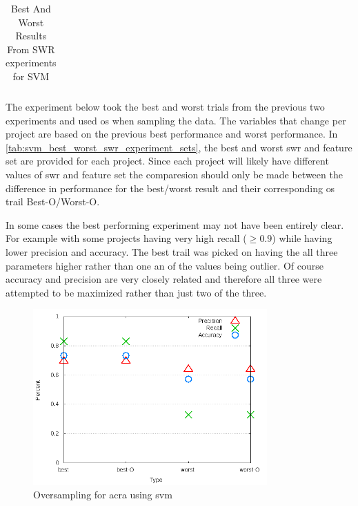\begin{table}[ht]
\begin{center}
\begin{tabular}{|c|c|c|c|c|}

        \hline
    \end{tabular}
    \caption{Best And Worst Results From SWR experiments for SVM}
    \label{tab:svm_best_worst_swr_experiment_sets}
\end{center}
\end{table}

The experiment below took the best and worst trials from the previous two experiments and used \gls{os} when sampling the data. The variables that change per project are based on the previous best performance and worst performance. In \autoref{tab:svm_best_worst_swr_experiment_sets}, the best and worst \gls{swr} and feature set are provided for each project. Since each project will likely have different values of \gls{swr} and feature set the comparesion should only be made between the difference in performance for the best/worst result and their corresponding \gls{os} trail Best-O/Worst-O.

In some cases the best performing experiment may not have been entirely clear. For example with some projects having very high recall ($ \geq 0.9$) while having lower precision and accuracy. The best trail was picked on having the all three parameters higher rather than one an of the values being outlier. Of course accuracy and precision are very closely related and therefore all three were attempted to be maximized rather than just two of the three.

\begin{figure}[!t]
    \centering

        \includegraphics[width=0.8\textwidth]{images/svm/test_4/acra_sample_range}
        \caption{Oversampling for acra using \gls{svm}}
        \label{fig:test_4_acra_svm}
\end{figure}

